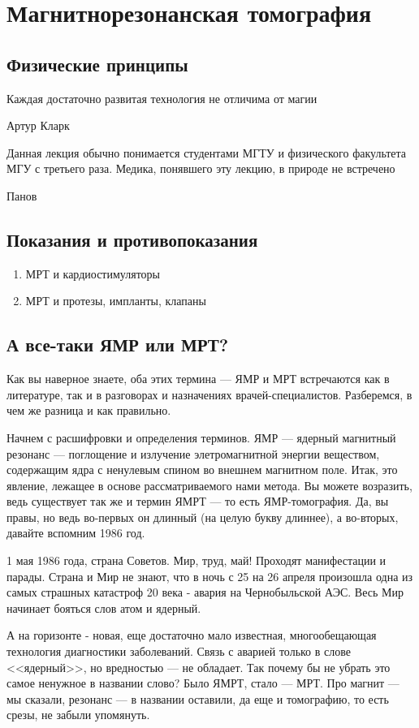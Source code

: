 \section{Магнитнорезонанская томография}

\subsection{Физические принципы}
\epigraph{Каждая достаточно развитая технология не отличима от магии}{Артур Кларк}
\epigraph{Данная лекция обычно понимается студентами МГТУ и физического факультета МГУ с третьего раза. Медика, понявшего эту лекцию, в природе не встречено}{Панов}

\subsection{Показания и противопоказания}

\begin{enumerate}
\item МРТ и кардиостимуляторы
\item МРТ и протезы, импланты, клапаны
\end{enumerate}


\subsection{А все-таки ЯМР или МРТ?}
Как вы наверное знаете, оба этих термина --- ЯМР и МРТ встречаются как в литературе, так и в разговорах и назначениях врачей-специалистов. Разберемся, в чем же разница и как правильно.

Начнем с расшифровки и определения терминов. ЯМР --- ядерный магнитный резонанс --- поглощение и излучение элетромагнитной энергии веществом, содержащим ядра с ненулевым спином во внешнем магнитном поле. Итак, это явление, лежащее в основе рассматриваемого нами метода. Вы можете возразить, ведь существует так же и термин ЯМРТ --- то есть ЯМР-томография. Да, вы правы, но ведь во-первых он длинный (на целую букву длиннее), а во-вторых, давайте вспомним 1986 год.

1 мая 1986 года, страна Советов. Мир, труд, май! Проходят манифестации и парады. Страна и Мир не знают, что в ночь с 25 на 26 апреля произошла одна из самых страшных катастроф 20 века - авария на Чернобыльской АЭС. Весь Мир начинает бояться слов атом и ядерный. 

А на горизонте - новая, еще достаточно мало известная, многообещающая технология диагностики заболеваний. Связь с аварией только в слове <<ядерный>>, но вредностью --- не обладает. Так почему бы не убрать это самое ненужное в названии слово? Было ЯМРТ, стало --- МРТ. Про магнит --- мы сказали, резонанс --- в названии оставили, да еще и томографию, то есть срезы, не забыли упомянуть. 

